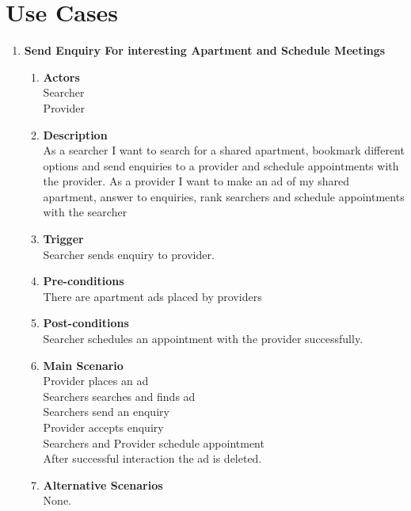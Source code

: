 \documentclass{scrreprt}
\begin{document}
\section{Use Cases}
\begin{enumerate}
	\item \textbf{Send Enquiry For interesting Apartment and Schedule Meetings}
	\begin{enumerate}
		\item \textbf{Actors}  \\
			Searcher  \\
			Provider\\

		\item \textbf{Description} \\
			As a searcher I want to search for a shared apartment, bookmark different options and send enquiries to a provider and schedule appointments with the provider.
			As a provider I want to make an ad of my shared apartment, answer to enquiries, rank searchers and schedule appointments with the searcher\\

		\item \textbf{Trigger} \\
			Searcher sends enquiry to provider.\\

		\item \textbf{Pre-conditions} \\
			There are apartment ads placed by providers\\

		\item \textbf{Post-conditions} \\
			Searcher schedules an appointment with the provider successfully.\\

		\item \textbf{Main Scenario} \\
			Provider places an ad\\
			Searchers searches and finds ad\\
			Searchers send an enquiry\\
			Provider accepts enquiry\\
			Searchers and Provider schedule appointment\\
			After successful interaction the ad is deleted.\\

		\item \textbf{Alternative Scenarios} \\
			None.


\end{enumerate}
\end{enumerate}
\end{document}
